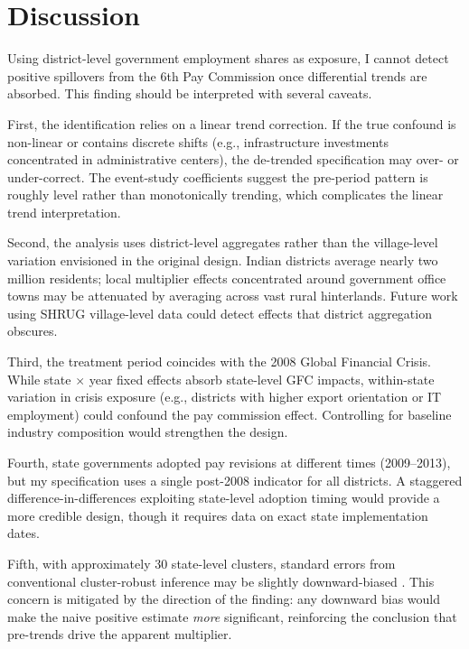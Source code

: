 \documentclass[12pt]{article}
\begin{document}


\section{Discussion}
\label{sec:discussion}

Using district-level government employment shares as exposure, I cannot detect positive spillovers from the 6th Pay Commission once differential trends are absorbed. This finding should be interpreted with several caveats.

First, the identification relies on a linear trend correction. If the true confound is non-linear or contains discrete shifts (e.g., infrastructure investments concentrated in administrative centers), the de-trended specification may over- or under-correct. The event-study coefficients suggest the pre-period pattern is roughly level rather than monotonically trending, which complicates the linear trend interpretation.

Second, the analysis uses district-level aggregates rather than the village-level variation envisioned in the original design. Indian districts average nearly two million residents; local multiplier effects concentrated around government office towns may be attenuated by averaging across vast rural hinterlands. Future work using SHRUG village-level data could detect effects that district aggregation obscures.

Third, the treatment period coincides with the 2008 Global Financial Crisis. While state $\times$ year fixed effects absorb state-level GFC impacts, within-state variation in crisis exposure (e.g., districts with higher export orientation or IT employment) could confound the pay commission effect. Controlling for baseline industry composition would strengthen the design.

Fourth, state governments adopted pay revisions at different times (2009--2013), but my specification uses a single post-2008 indicator for all districts. A staggered difference-in-differences exploiting state-level adoption timing \citep{Clemens2012} would provide a more credible design, though it requires data on exact state implementation dates.

Fifth, with approximately 30 state-level clusters, standard errors from conventional cluster-robust inference may be slightly downward-biased \citep{Cameron2008}. This concern is mitigated by the direction of the finding: any downward bias would make the naive positive estimate \textit{more} significant, reinforcing the conclusion that pre-trends drive the apparent multiplier.
\end{document}
